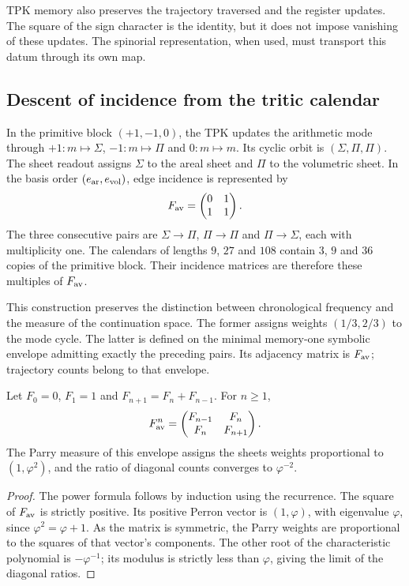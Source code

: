 TPK memory also preserves the trajectory traversed and the register
updates. The square of the sign character is the identity, but it does not impose
vanishing of these updates. The spinorial representation, when
used, must transport this datum through its own map.

\subsection{Descent of incidence from the tritic calendar}

In the primitive block $(+1,-1,0)$, the TPK updates the arithmetic mode through
$+1:m\mapsto\Sigma$, $-1:m\mapsto\Pi$ and $0:m\mapsto m$. Its cyclic orbit
is $(\Sigma,\Pi,\Pi)$. The sheet readout assigns $\Sigma$ to the areal sheet and
$\Pi$ to the volumetric sheet. In the basis order $(e_{\rm ar},e_{\rm vol})$,
edge incidence is represented by
\begin{equation}
 F_{\rm av}=\begin{pmatrix}0&1\\1&1\end{pmatrix}.
 \label{iii:eq:fav}
\end{equation}
The three consecutive pairs are $\Sigma\to\Pi$, $\Pi\to\Pi$ and
$\Pi\to\Sigma$, each with multiplicity one. The calendars of lengths
$9$, $27$ and $108$ contain $3$, $9$ and $36$ copies of the primitive block.
Their incidence matrices are therefore these multiples of $F_{\rm av}$.

This construction preserves the distinction between chronological frequency and the measure
of the continuation space. The former assigns weights $(1/3,2/3)$ to the mode
cycle. The latter is defined on the minimal memory-one symbolic envelope
admitting exactly the preceding pairs. Its adjacency matrix is
$F_{\rm av}$; trajectory counts belong to that envelope.

\begin{proposition}
Let $F_0=0$, $F_1=1$ and $F_{n+1}=F_n+F_{n-1}$. For $n\geq1$,
\begin{equation}
 F_{\rm av}^{n}=
 \begin{pmatrix}F_{n-1}&F_n\\F_n&F_{n+1}\end{pmatrix}.
 \label{iii:eq:fav-powers}
\end{equation}
The Parry measure of this envelope assigns the sheets weights proportional
to $(1,\varphi^2)$, and the ratio of diagonal counts converges to $\varphi^{-2}$.
\end{proposition}
\begin{proof}
The power formula follows by induction using the recurrence.
The square of $F_{\rm av}$ is strictly positive. Its positive Perron
vector is $(1,\varphi)$, with eigenvalue $\varphi$, since
$\varphi^2=\varphi+1$. As the matrix is symmetric, the Parry weights are
proportional to the squares of that vector's components. The other root
of the characteristic polynomial is $-\varphi^{-1}$; its modulus is strictly
less than $\varphi$, giving the limit of the diagonal ratios.
\end{proof}

